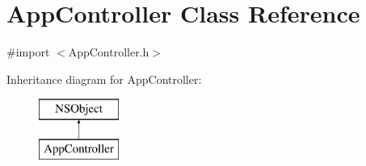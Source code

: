 \hypertarget{interface_app_controller}{\section{App\-Controller Class Reference}
\label{interface_app_controller}
}


{\ttfamily \#import $<$App\-Controller.\-h$>$}

Inheritance diagram for App\-Controller\-:\begin{figure}[H]
\begin{center}
\leavevmode
\includegraphics[height=2.000000cm]{interface_app_controller}
\end{center}
\end{figure}
